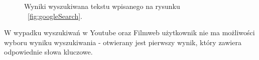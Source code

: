 \documentclass[twoside,a4paper]{book}
\begin{document}
	\begin{figure}
		\centering
		\caption{Wyniki wyszukiwana tekstu wpisanego na rysunku ~\ref{fig:googleSearch}.}
		\label{fig:searchResult}
		\end{figure}
W wypadku wyszukiwań w Youtube oraz Filmweb użytkownik nie ma możliwości wyboru  wyniku wyszukiwania - otwierany jest pierwszy wynik, który zawiera odpowiednie słowa kluczowe.
\end{document}
